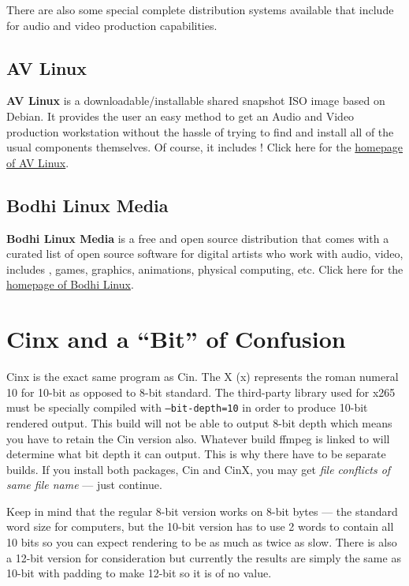 There are also some special complete distribution systems
available that include \CGG{} for audio and video production
capabilities.

\subsection{AV Linux}
\label{sec:AV_Linux}

\textbf{AV Linux} is a downloadable/installable shared snapshot
ISO image based on Debian.  It provides the user an easy method to
get an Audio and Video production workstation without the hassle
of trying to find and install all of the usual components
themselves.  Of course, it includes \CGG{}!
%
Click here for the
\href{http://www.bandshed.net/avlinux/}{homepage of AV Linux}.

\subsection{Bodhi Linux Media}
\label{sec:Bodhi_Linux}

\textbf{Bodhi Linux Media} is a free and open source distribution that
comes with a curated list of open source software for digital
artists who work with audio, video, includes \CGG{}, games,
graphics, animations, physical computing, etc.
%
Click here for the
\href{https://gitlab.com/giuseppetorre/bodhilinuxmedia}{homepage of Bodhi Linux}.


\section{Cinx and a “Bit” of Confusion}%
\label{sec:cinx_and_a_bit_of_confusion}

Cinx is the exact same program as Cin.  The X (x) represents the
roman numeral 10 for 10-bit as opposed to 8-bit standard.  The
third-party library used for x265 must be specially compiled with
\texttt{--bit-depth=10} in order to produce 10-bit rendered
output.
%
This build will not be able to output 8-bit depth which means you
have to retain the Cin version also.
%
Whatever build ffmpeg is linked to will determine what bit depth
it can output.  This is why there have to be separate builds.  If
you install both packages, Cin and CinX, you may get \textit{file
  conflicts of same file name} --- just continue.

Keep in mind that the regular 8-bit version works on 8-bit bytes
--- the standard word size for computers, but the 10-bit version
has to use 2 words to contain all 10 bits so you can expect
rendering to be as much as twice as slow.
%
There is also a 12-bit version for consideration but currently the
results are simply the same as 10-bit with padding to make 12-bit
so it is of no value.


